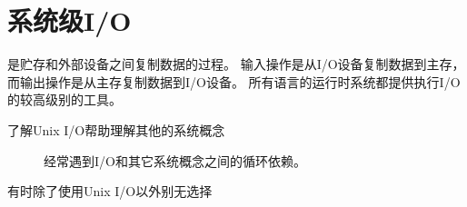 
\chapter{系统级I/O}
{
    是贮存和外部设备之间复制数据的过程。
    输入操作是从I/O设备复制数据到主存，而输出操作是从主存复制数据到I/O设备。
    所有语言的运行时系统都提供执行I/O的较高级别的工具。

    \begin{description}
        \item[了解Unix I/O帮助理解其他的系统概念] 经常遇到I/O和其它系统概念之间的循环依赖。
        \item[有时除了使用Unix I/O以外别无选择]
    \end{description}

    
    
    
    
    
    
    
    
    
    
    
}

\cleardoublepage

\endinput

